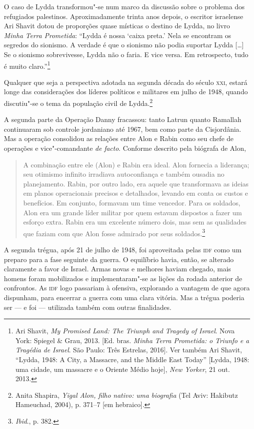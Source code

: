 O caso de Lydda transformou"-se num marco da discussão sobre o problema
dos refugiados palestinos. Aproximadamente trinta anos depois, o escritor
israelense Ari Shavit dotou de proporções quase místicas o destino de
	Lydda, no livro \textit{Minha Terra Prometida}: ``Lydda é nossa `caixa
	preta.' Nela se encontram os segredos do sionismo. A verdade é que o
	sionismo não podia suportar Lydda {[}\ldots{}{]} Se o sionismo sobrevivesse, Lydda
não o faria. E vice versa. Em retrospecto, tudo é muito
claro.''\footnote{Ari Shavit, \textit{My Promised Land: The Triunph and Tragedy of Israel}. Nova York: Spiegel \& Grau, 2013. {[}Ed. bras. \textit{Minha Terra Prometida: o Triunfo e a Tragédia de Israel}. São Paulo: Três Estrelas, 2016{]}. Ver também Ari Shavit, ``Lydda, 1948: A City,
a Massacre, and the Middle East Today'' [Lydda, 1948: uma cidade, um massacre e o Oriente Médio hoje],
\textit{New Yorker}, 21 out. 2013.}

Qualquer que seja a perspectiva adotada na segunda década do século \textsc{xxi},
estará longe das considerações dos líderes políticos e militares em
julho de 1948, quando discutiu"-se o tema da população civil de
Lydda.\footnote{Anita Shapira, \textit{Yigal Alon, filho nativo: uma biografia} (Tel Aviv:
Hakibutz Hameuchad, 2004), p. 371--7 {[}em hebraico{]}.}

A segunda parte da Operação Danny fracassou: tanto Latrun quanto
Ramallah continuaram sob controle jordaniano até 1967, bem como parte da Cisjordânia.
Mas a operação consolidou as relações entre Alon e Rabin como
seu chefe de operações e vice"-comandante \textit{de facto}. Conforme
descrito pela biógrafa de Alon, 

\begin{quote}
A combinação entre ele (Alon) e Rabin
era ideal. Alon fornecia a liderança; seu otimismo infinito irradiava 
autoconfiança e também ousadia no planejamento. Rabin,
por outro lado, era aquele que transformava as ideias em planos
operacionais precisos e detalhados, levando em conta os custos e
benefícios. Em conjunto, formavam um time vencedor. Para os soldados, Alon
era um grande líder militar por quem estavam dispostos a fazer um
esforço extra. Rabin era um excelente número dois, mas sem as qualidades
que faziam com que Alon fosse admirado por seus soldados.\footnote{\textit{Ibid}., p. 382.}
\end{quote}

A segunda trégua, após 21 de julho de 1948, foi aproveitada pelas \textsc{idf}
como um preparo para a fase seguinte da guerra. O equilíbrio havia,
então, se alterado claramente a favor de Israel. Armas novas e melhores
haviam chegado, mais homens foram mobilizados e 
implementaram"-se as lições da rodada anterior de confrontos. As \textsc{idf} logo
passariam à ofensiva, explorando a vantagem de que agora dispunham, para
encerrar a guerra com uma clara vitória. Mas a trégua poderia ser --- e foi ---
utilizada também com outras finalidades.


